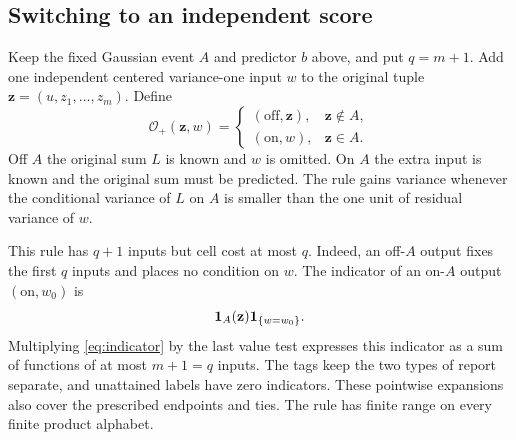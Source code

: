 \subsection{Switching to an independent score}\label{subsec:extra-block}

Keep the fixed Gaussian event $A$ and predictor $b$ above, and put
$q=m+1$. Add one independent centered variance-one input $w$ to the
original tuple $\mathbf z=(u,z_1,\ldots,z_m)$. Define
\[
 \mathcal O_+(\mathbf z,w)=
 \begin{cases}
   (\mathrm{off},\mathbf z),&\mathbf z\notin A,\\
   (\mathrm{on},w),&\mathbf z\in A.
 \end{cases}
\]
Off $A$ the original sum $L$ is known and $w$ is omitted. On $A$
the extra input is known and the original sum must be predicted.
The rule gains variance whenever the conditional variance of $L$ on
$A$ is smaller than the one unit of residual variance of $w$.

This rule has $q+1$ inputs but cell cost at most $q$. Indeed, an
off-$A$ output fixes the first $q$ inputs and places no condition on
$w$. The indicator of an on-$A$ output $(\mathrm{on},w_0)$ is
\[
 \mathbf 1_A(\mathbf z)\mathbf 1_{\{w=w_0\}}.
\]
Multiplying \eqref{eq:indicator} by the last value test expresses
this indicator as a sum of functions of at most $m+1=q$ inputs.
The tags keep the two types of report separate, and unattained labels
have zero indicators. These pointwise expansions also cover the
prescribed endpoints and ties. The rule has finite range on every
finite product alphabet.

